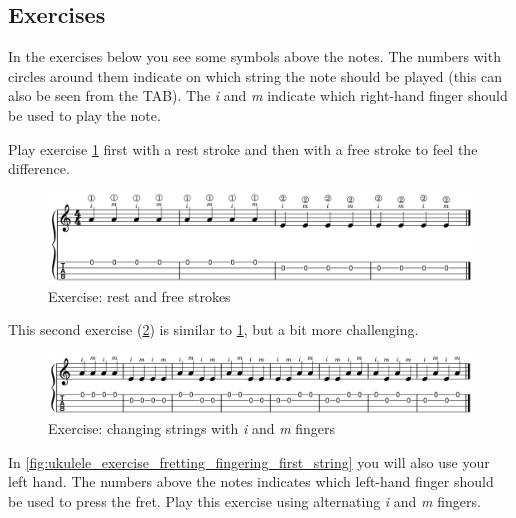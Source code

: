 \newpage

\subsection{Exercises}

In the exercises below you see some symbols above the notes. The numbers with circles around them indicate on which string the note should be played (this can also be seen from the TAB). The \textit{i} and \textit{m} indicate which right-hand finger should be used to play the note.

Play exercise \ref{fig:ukulele_exercise_rest_free_stroke} first with a rest stroke and then with a free stroke to feel the difference.

\begin{figure}[h]
    \centering
    \includegraphics[width=\textwidth]{../MuseScore/Ukulele/UkuleleExerciseFreeAndRestStokeSimple.png}
    \caption{Exercise: rest and free strokes}
    \label{fig:ukulele_exercise_rest_free_stroke}
\end{figure}

This second exercise (\ref{fig:ukulele_exercise_i_m_string_change}) is similar to \ref{fig:ukulele_exercise_rest_free_stroke}, but a bit more challenging.

\begin{figure}[h]
    \centering
    \includegraphics[width=\textwidth]{../MuseScore/Ukulele/UkuleleExerciseFreeAndRestStokeStepTwo.png}
    \caption{Exercise: changing strings with \textit{i} and \textit{m} fingers}
    \label{fig:ukulele_exercise_i_m_string_change}
\end{figure}

\newpage

In \ref{fig:ukulele_exercise_fretting_fingering_first_string} you will also use your left hand. The numbers above the notes indicates which left-hand finger should be used to press the fret. Play this exercise using alternating \textit{i} and \textit{m} fingers. 

